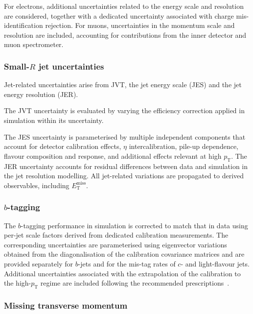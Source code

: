 For electrons, additional uncertainties related to the energy scale and resolution are considered, together with a dedicated uncertainty associated with charge mis-identification rejection.
For muons, uncertainties in the momentum scale and resolution are included, accounting for contributions from the inner detector and muon spectrometer.

\subsubsection{Small-$R$ jet uncertainties}

Jet-related uncertainties arise from JVT, the jet energy scale (JES) and the jet energy resolution (JER).

The JVT uncertainty is evaluated by varying the efficiency correction applied in simulation within its uncertainty.

The JES uncertainty is parameterised by multiple independent components that account for detector calibration effects, $\eta$ intercalibration, pile-up dependence, flavour composition and response, and additional effects relevant at high $p_{\mathrm{T}}$.
The JER uncertainty accounts for residual differences between data and simulation in the jet resolution modelling.
All jet-related variations are propagated to derived observables, including $E_{\mathrm{T}}^{\mathrm{miss}}$.

\subsubsection{$b$-tagging}
\label{b-tagging_uncertianties}

The $b$-tagging performance in simulation is corrected to match that in data using per-jet scale factors derived from dedicated calibration measurements.
The corresponding uncertainties are parameterised using eigenvector variations obtained from the diagonalisation of the calibration covariance matrices and are provided separately for $b$-jets and for the mis-tag rates of $c$- and light-flavour jets.
Additional uncertainties associated with the extrapolation of the calibration to the high-$p_{\mathrm{T}}$ regime are included following the recommended prescriptions~\cite{high_pt_extrapolation,btagging_rec_2023}.

\subsubsection{Missing transverse momentum}

